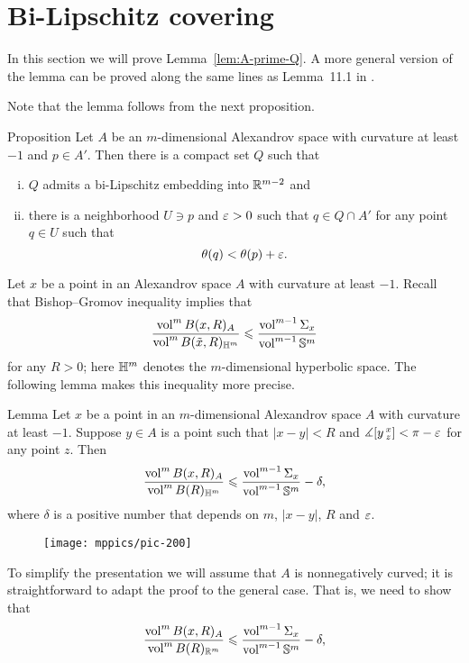 \section{Bi-Lipschitz covering}\label{sec:bilip}

In this section we will prove Lemma~\ref{lem:A-prime-Q}.
A more general version of the lemma can be proved along the same lines as Lemma~11.1 in \cite{simon}.

Note that the lemma follows from the next proposition.


\begin{thm}{Proposition}\label{prop:Q-covering}
Let $A$ be an $m$-dimensional Alexandrov space with curvature at least $-1$ and $p\in A'$.
Then there is a compact set $Q$ such that 
\begin{enumerate}[(i)]
 \item $Q$ admits a bi-Lipschitz embedding into $\mathbb{R}^{m-2}$ and
 \item there is a neighborhood $U\ni p$ and $\varepsilon>0$ such that $q\in Q\cap A'$ for any point $q\in U$ such that 
 \[\theta(q)<\theta(p)+\varepsilon.\]
\end{enumerate}
\end{thm}

Let $x$ be a point in an Alexandrov space $A$ with curvature at least $-1$.
Recall that Bishop--Gromov inequality implies that 
\[\frac{\operatorname{vol}^m B(x,R)_A}{\operatorname{vol}^m B(\tilde x,R)_{\mathbb{H}^m}}\leqslant \frac{\operatorname{vol}^{m-1} \Sigma_x}{\operatorname{vol}^{m-1} \mathbb{S}^m}\]
for any $R>0$; here $\mathbb{H}^m$ denotes the $m$-dimensional hyperbolic space.
The following lemma makes this inequality more precise. 

\begin{thm}{Lemma}
Let $x$ be a point in an $m$-dimensional Alexandrov space $A$ with curvature at least $-1$.
Suppose $y\in A$ is a point such that $|x-y|<R$ and $\measuredangle[y\,{}^{x}_{z}]<\pi-\varepsilon$ for any point $z$.
Then
\[\frac{\operatorname{vol}^m B(x,R)_A}{\operatorname{vol}^m B(R)_{\mathbb{H}^m}}\leqslant \frac{\operatorname{vol}^{m-1} \Sigma_x}{\operatorname{vol}^{m-1} \mathbb{S}^m}-\delta,\]
where $\delta$ is a positive number that depends on $m$, $|x-y|$, $R$ and $\varepsilon$.
 
\end{thm}

\begin{wrapfigure}{r}{35 mm}
\vskip-0mm
\centering
\texttt{[image: mppics/pic-200]}
\vskip0mm
\end{wrapfigure}

To simplify the presentation we will assume that $A$ is nonnegatively curved;
it is straightforward to adapt the proof to the general case.
That is, we need to show that 
\[\frac{\operatorname{vol}^m B(x,R)_A}{\operatorname{vol}^m B(R)_{\mathbb{R}^m}}\leqslant \frac{\operatorname{vol}^{m-1} \Sigma_x}{\operatorname{vol}^{m-1} \mathbb{S}^m}-\delta,\]

